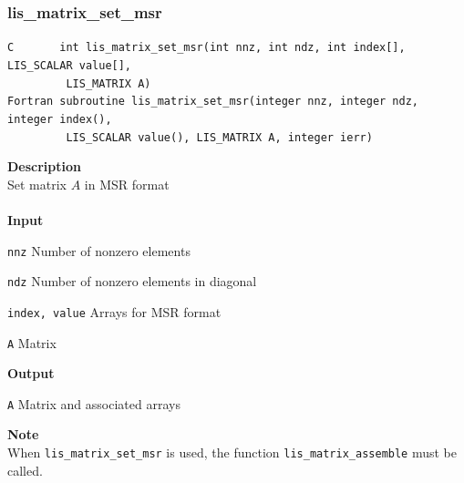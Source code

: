 \documentclass[a4paper]{article}
\newcommand{\namelistlabel}[1]{\mbox{#1}\hfill}
\newenvironment{namelist}[1]{%
 \begin{list}{}
  {\let\makelabel\namelistlabel
  \settowidth{\labelwidth}{#1}
  \setlength{\leftmargin}{1.1\labelwidth}}
}{%
\end{list}}
\begin{document}
  \subsubsection{lis\_matrix\_set\_msr}
\begin{screen}
\verb|C       int lis_matrix_set_msr(int nnz, int ndz, int index[], LIS_SCALAR value[],|\\
\verb|         LIS_MATRIX A)| \\
\verb|Fortran subroutine lis_matrix_set_msr(integer nnz, integer ndz, integer index(),|\\
\verb|         LIS_SCALAR value(), LIS_MATRIX A, integer ierr)|
\end{screen}
{\bf Description}\\
\indent
Set matrix $A$ in MSR format
\\ \\
\noindent
{\bf Input}
\begin{namelist}{XXXXXXXXXXXXXXXXXXXX}
\item[\tt nnz] Number of nonzero elements
\item[\tt ndz] Number of nonzero elements in diagonal
\item[\tt index, value] Arrays for MSR format
\item[\tt A] Matrix
\end{namelist}
{\bf Output}
\begin{namelist}{XXXXXXXXXXXXXXXXXXXX}
\item[\tt A] Matrix and associated arrays
\end{namelist}
\noindent
{\bf Note}\\
\indent
When \verb|lis_matrix_set_msr| is used, 
the function \verb|lis_matrix_assemble| must be called. 

\end{document}
